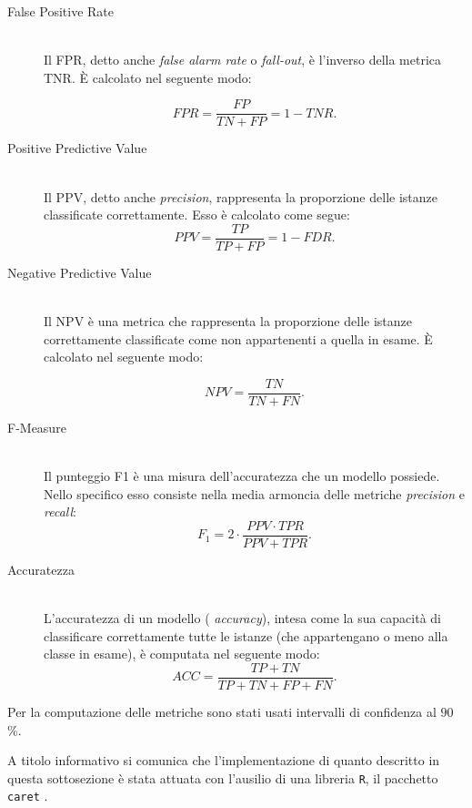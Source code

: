 \begin{description}
	\item[False Positive Rate] \hfill \\
	Il \acf{FPR}, detto anche \emph{false alarm rate} o \emph{fall-out}, è l'inverso della metrica \acs{TNR}. \`E calcolato nel seguente modo:\par
	\[FPR = \frac{FP}{TN + FP} = 1 - TNR\text{.}\]
	\item[Positive Predictive Value] \hfill \\
	Il \acf{PPV}, detto anche \emph{precision}, rappresenta la proporzione delle istanze classificate correttamente. Esso è calcolato come segue:
	\[PPV = \frac{TP}{TP + FP} = 1 - FDR\text{.}\]
	\item[Negative Predictive Value] \hfill \\
	Il \acf{NPV} è una metrica che rappresenta la proporzione delle istanze correttamente classificate come non appartenenti a quella in esame. \`E calcolato nel seguente modo:\par
	\[NPV = \frac{TN}{TN + FN}\text{.}\]
	\item[F-Measure] \hfill \\
	Il punteggio \acf{F1} è una misura dell'accuratezza che un modello possiede. Nello specifico esso consiste nella media armoncia delle metriche \emph{precision} e \emph{recall}:
	\[F_1 = 2 \cdot \frac{PPV \cdot TPR}{PPV + TPR}\text{.}\]
	\item[Accuratezza] \hfill \\
	L'accuratezza di un modello (\ie{} \emph{accuracy}), intesa come la sua capacità di classificare correttamente tutte le istanze (che appartengano o meno alla classe in esame), è computata nel seguente modo:
	\[ACC = \frac{TP + TN}{TP + TN + FP + FN}\text{.}\]
\end{description}
Per la computazione delle metriche sono stati usati intervalli di confidenza al $90$\%.

A titolo informativo si comunica che l'implementazione di quanto descritto in questa sottosezione è stata attuata con l'ausilio di una libreria \lstinline$R$, il pacchetto \lstinline$caret$ \citep{CARET2013}.

